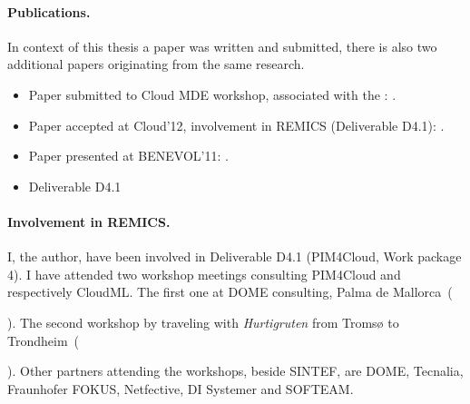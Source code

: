 \paragraph{Publications.}

In context of this thesis a paper was written and submitted,
there is also two additional papers originating from the same research.

\begin{itemize}
  \item
    Paper submitted to Cloud MDE workshop, associated with the :
    .
  \item
    Paper accepted at Cloud'12, involvement in REMICS (Deliverable D4.1):
    .
  \item
    Paper presented at BENEVOL'11:
    .
   \item 
     Deliverable D4.1
\end{itemize}

\paragraph{Involvement in REMICS.}

I, the author, have been involved in  Deliverable D4.1 (PIM4Cloud, Work package 4).
I have attended two workshop meetings consulting PIM4Cloud and respectively CloudML.
The first one at DOME consulting, Palma de Mallorca~(\date{June 2011}).
The second workshop by traveling with \emph{Hurtigruten} from Troms{\o} to Trondheim~(\date{September 2011}).
Other partners attending the workshops, beside SINTEF, are DOME, Tecnalia, Fraunhofer FOKUS, Netfective, DI Systemer and SOFTEAM.
